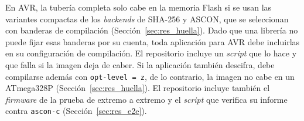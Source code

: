 En AVR, la tubería completa solo cabe en la memoria Flash si se usan las variantes compactas de los \textit{backends} de SHA-256 y ASCON, que se seleccionan con banderas de compilación (Sección~\ref{sec:res_huella}). Dado que una librería no puede fijar esas banderas por su cuenta, toda aplicación para AVR debe incluirlas en su configuración de compilación. El repositorio incluye un \textit{script} que lo hace y que falla si la imagen deja de caber. Si la aplicación también descifra, debe compilarse además con \texttt{opt-level = \textquotedbl{}z\textquotedbl{}}, de lo contrario, la imagen no cabe en un ATmega328P (Sección~\ref{sec:res_huella}). El repositorio incluye también el \textit{firmware} de la prueba de extremo a extremo y el \textit{script} que verifica su informe contra \texttt{ascon-c} (Sección~\ref{sec:res_e2e}).
